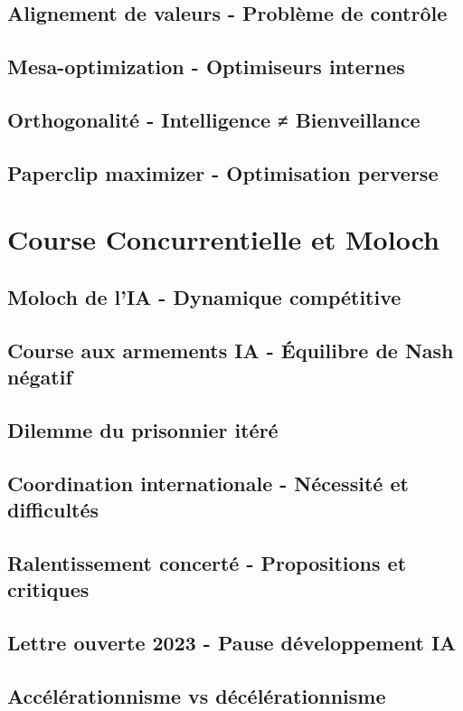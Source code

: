 \documentclass[12pt,a4paper]{book}
\begin{document}
\section{Alignement de valeurs - Problème de contrôle}
\section{Mesa-optimization - Optimiseurs internes}
\section{Orthogonalité - Intelligence ≠ Bienveillance}
\section{Paperclip maximizer - Optimisation perverse}

\chapter{Course Concurrentielle et Moloch}
\section{Moloch de l'IA - Dynamique compétitive}
\section{Course aux armements IA - Équilibre de Nash négatif}
\section{Dilemme du prisonnier itéré}
\section{Coordination internationale - Nécessité et difficultés}
\section{Ralentissement concerté - Propositions et critiques}
\section{Lettre ouverte 2023 - Pause développement IA}
\section{Accélérationnisme vs décélérationnisme}
\end{document}
